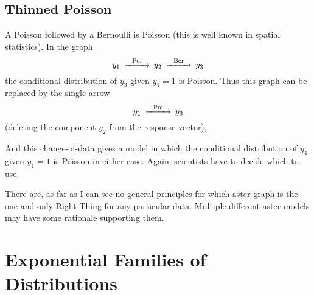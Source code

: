 \subsection{Thinned Poisson}

A Poisson followed by a Bernoulli is Poisson (this is well known in spatial
statistics).  In the graph
\begin{equation} \label{gr:poisson-bernoulli}
\begin{CD}
   y_1 @>\text{Poi}>> y_2 @>\text{Ber}>> y_3
\end{CD}
\end{equation}
the conditional distribution of $y_3$ given $y_1 = 1$ is Poisson.  Thus this
graph can be replaced by the single arrow
\begin{equation} \label{gr:poisson}
\begin{CD}
   y_1 @>\text{Poi}>> y_3
\end{CD}
\end{equation}
(deleting the component $y_2$ from the response vector),

And this change-of-data gives a model in which the conditional distribution
of $y_4$ given $y_1 = 1$ is Poisson in either case.
Again, scientists have to decide which to use.

There are, as far as I can see no general principles for which aster graph
is the one and only Right Thing for any particular data.  Multiple different
aster models may have some rationale supporting them.



\section{Exponential Families of Distributions}

